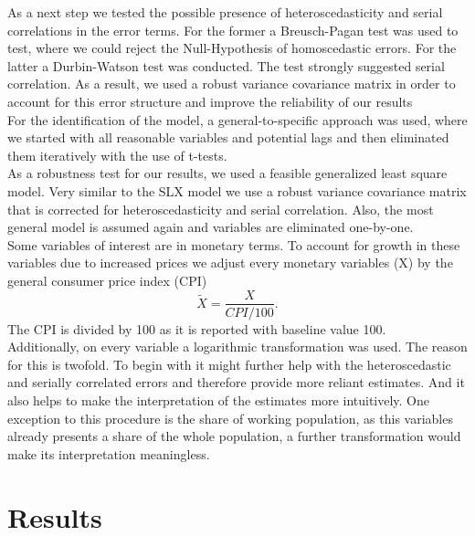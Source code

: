 \documentclass[
]{article}
\begin{document}
	As a next step we tested the possible presence of heteroscedasticity and serial correlations in the error terms. For the former a Breusch-Pagan test was used to test, where we could reject the Null-Hypothesis of homoscedastic errors. For the latter a Durbin-Watson test was conducted. The test strongly suggested serial correlation. As a result, we used a robust variance covariance matrix in order to account for this error structure and improve the reliability of our results\\
	For the identification of the model, a general-to-specific approach was used, where we started with all reasonable variables and potential lags and then eliminated them iteratively with the use of t-tests.\\
	As a robustness test for our results, we used a feasible generalized least square model. Very similar to the SLX model we use a robust variance covariance matrix that is corrected for heteroscedasticity and serial correlation. Also, the most general model is assumed again and variables are eliminated one-by-one.\\
	Some variables of interest are in monetary terms. To account for growth in these variables due to increased prices we adjust every monetary variables (X) by the general consumer price index (CPI)
	$$\widetilde{X} = \frac{X}{CPI/100}.$$
	The CPI is divided by 100 as it is reported with baseline value 100.\\
	Additionally, on every variable a logarithmic transformation was used. The reason for this is twofold. To begin with it might further help with the heteroscedastic and serially correlated errors and therefore provide more reliant estimates. And it also helps to make the interpretation of the estimates more intuitively. One exception to this procedure is the share of working population, as this variables already presents a share of the whole population, a further transformation would make its interpretation meaningless.\\



	\section{Results} \label{Results}
\end{document}
